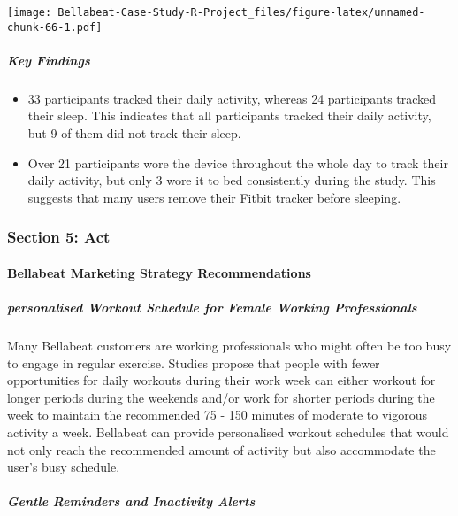 \documentclass[
]{article}
\providecommand{\tightlist}{%
  \setlength{\itemsep}{0pt}\setlength{\parskip}{0pt}}
\begin{document}
\texttt{[image: Bellabeat-Case-Study-R-Project\_files/figure-latex/unnamed-chunk-66-1.pdf]}

\hypertarget{key-findings-6}{%
\subparagraph{Key Findings}\label{key-findings-6}}

\begin{itemize}
\tightlist
\item
  33 participants tracked their daily activity, whereas 24 participants
  tracked their sleep. This indicates that all participants tracked
  their daily activity, but 9 of them did not track their sleep.
\item
  Over 21 participants wore the device throughout the whole day to track
  their daily activity, but only 3 wore it to bed consistently during
  the study. This suggests that many users remove their Fitbit tracker
  before sleeping.
\end{itemize}

\hypertarget{section-5-act}{%
\subsubsection{Section 5: Act}\label{section-5-act}}

\hypertarget{bellabeat-marketing-strategy-recommendations}{%
\paragraph{Bellabeat Marketing Strategy
Recommendations}\label{bellabeat-marketing-strategy-recommendations}}

\hypertarget{personalised-workout-schedule-for-female-working-professionals}{%
\subparagraph{personalised Workout Schedule for Female Working
Professionals}\label{personalised-workout-schedule-for-female-working-professionals}}

Many Bellabeat customers are working professionals who might often be
too busy to engage in regular exercise. Studies propose that people with
fewer opportunities for daily workouts during their work week can either
workout for longer periods during the weekends and/or work for shorter
periods during the week to maintain the recommended 75 - 150 minutes of
moderate to vigorous activity a week. Bellabeat can provide personalised
workout schedules that would not only reach the recommended amount of
activity but also accommodate the user's busy schedule.

\hypertarget{gentle-reminders-and-inactivity-alerts}{%
\subparagraph{Gentle Reminders and Inactivity
Alerts}\label{gentle-reminders-and-inactivity-alerts}}
\end{document}
